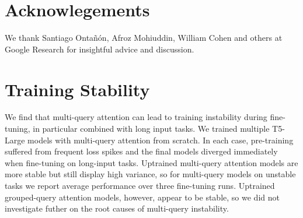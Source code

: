 \documentclass[11pt]{article}
\begin{document}
\section*{Acknowlegements}
We thank Santiago Onta\~{n}\'{o}n, Afroz Mohiuddin, William Cohen and others at Google Research for insightful advice and discussion. 




\clearpage
\appendix

\section{Training Stability}

We find that multi-query attention can lead to training instability during fine-tuning, in particular combined with long input tasks. We trained multiple T5-Large models with multi-query attention from scratch. In each case, pre-training suffered from frequent loss spikes and the final models diverged immediately when fine-tuning on long-input tasks. Uptrained multi-query attention models are more stable but still display high variance, so for multi-query models on unstable tasks we report average performance over three fine-tuning runs. Uptrained grouped-query attention models, however, appear to be stable, so we did not investigate futher on the root causes of multi-query instability.
\end{document}
